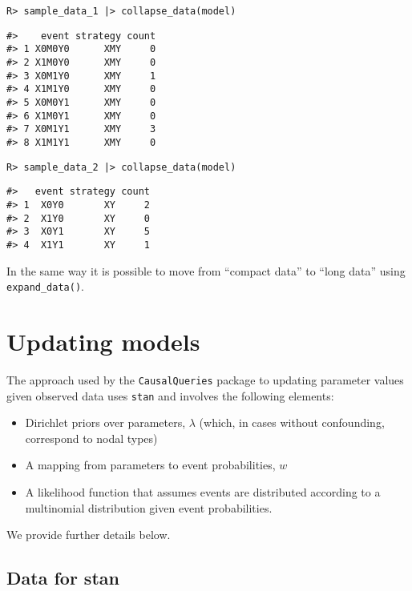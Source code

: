 \documentclass[
  11pt,
  article]{jss}
\providecommand{\tightlist}{%
  \setlength{\itemsep}{0pt}\setlength{\parskip}{0pt}}\usepackage{longtable,booktabs,array}
\begin{document}
\begin{verbatim}
R> sample_data_1 |> collapse_data(model)
\end{verbatim}

\begin{verbatim}
#>    event strategy count
#> 1 X0M0Y0      XMY     0
#> 2 X1M0Y0      XMY     0
#> 3 X0M1Y0      XMY     1
#> 4 X1M1Y0      XMY     0
#> 5 X0M0Y1      XMY     0
#> 6 X1M0Y1      XMY     0
#> 7 X0M1Y1      XMY     3
#> 8 X1M1Y1      XMY     0
\end{verbatim}

\begin{verbatim}
R> sample_data_2 |> collapse_data(model)
\end{verbatim}

\begin{verbatim}
#>   event strategy count
#> 1  X0Y0       XY     2
#> 2  X1Y0       XY     0
#> 3  X0Y1       XY     5
#> 4  X1Y1       XY     1
\end{verbatim}

In the same way it is possible to move from ``compact data'' to ``long
data'' using \texttt{expand\_data()}.

\hypertarget{updating-models}{%
\section{Updating models}\label{updating-models}}

The approach used by the \texttt{CausalQueries} package to updating
parameter values given observed data uses \texttt{stan} and involves the
following elements:

\begin{itemize}
\tightlist
\item
  Dirichlet priors over parameters, \(\lambda\) (which, in cases without
  confounding, correspond to nodal types)
\item
  A mapping from parameters to event probabilities, \(w\)
\item
  A likelihood function that assumes events are distributed according to
  a multinomial distribution given event probabilities.
\end{itemize}

We provide further details below.

\hypertarget{data-for-stan}{%
\subsection{Data for stan}\label{data-for-stan}}
\end{document}
